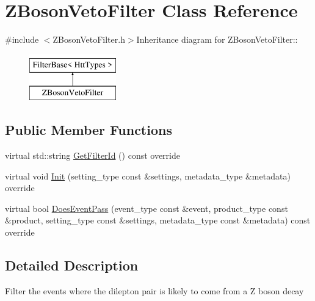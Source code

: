 \hypertarget{classZBosonVetoFilter}{
\section{ZBosonVetoFilter Class Reference}
\label{classZBosonVetoFilter}
}


{\ttfamily \#include $<$ZBosonVetoFilter.h$>$}Inheritance diagram for ZBosonVetoFilter::\begin{figure}[H]
\begin{center}
\leavevmode
\includegraphics[height=2cm]{classZBosonVetoFilter}
\end{center}
\end{figure}
\subsection*{Public Member Functions}
\begin{DoxyCompactItemize}
\item 
virtual std::string \hyperlink{classZBosonVetoFilter_a00f42a5e70a9c9e302655ce1cf355eb6}{GetFilterId} () const override
\item 
virtual void \hyperlink{classZBosonVetoFilter_ab6e03e6480217f6345ffd7df2737f8b4}{Init} (setting\_\-type const \&settings, metadata\_\-type \&metadata) override
\item 
virtual bool \hyperlink{classZBosonVetoFilter_a4a31bbec91004fcc89f1c1d131c57f65}{DoesEventPass} (event\_\-type const \&event, product\_\-type const \&product, setting\_\-type const \&settings, metadata\_\-type const \&metadata) const override
\end{DoxyCompactItemize}


\subsection{Detailed Description}
Filter the events where the dilepton pair is likely to come from a Z boson decay 

